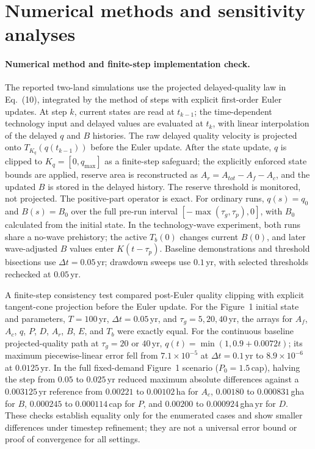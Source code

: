 \documentclass[11pt,a4paper]{article}
\begin{document}
\section{Numerical methods and sensitivity analyses}\label{si:numerics}

\paragraph{Numerical method and finite-step implementation check.} The reported two-land simulations use the projected delayed-quality law in Eq.~(10), integrated by the method of steps with explicit first-order Euler updates. At step $k$, current states are read at $t_{k-1}$; the time-dependent technology input and delayed values are evaluated at $t_k$, with linear interpolation of the delayed $q$ and $B$ histories. The raw delayed quality velocity is projected onto $T_{K_q}(q(t_{k-1}))$ before the Euler update. After the state update, $q$ is clipped to $K_q=[0,q_{\max}]$ as a finite-step safeguard; the explicitly enforced state bounds are applied, reserve area is reconstructed as $A_r=A_{tot}-A_f-A_c$, and the updated $B$ is stored in the delayed history. The reserve threshold is monitored, not projected. The positive-part operator is exact. For ordinary runs, $q(s)=q_0$ and $B(s)=B_0$ over the full pre-run interval $[-\max(\tau_g,\tau_p),0]$, with $B_0$ calculated from the initial state. In the technology-wave experiment, both runs share a no-wave prehistory; the active $T_b(0)$ changes current $B(0)$, and later wave-adjusted $B$ values enter $K(t-\tau_p)$. Baseline demonstrations and threshold bisections use $\Delta t=0.05$\,yr; drawdown sweeps use $0.1$\,yr, with selected thresholds rechecked at $0.05$\,yr.

A finite-step consistency test compared post-Euler quality clipping with explicit tangent-cone projection before the Euler update. For the Figure~1 initial state and parameters, $T=100$\,yr, $\Delta t=0.05$\,yr, and $\tau_g=5,20,40$\,yr, the arrays for $A_f$, $A_c$, $q$, $P$, $D$, $A_r$, $B$, $E$, and $T_b$ were exactly equal. For the continuous baseline projected-quality path at $\tau_g=20$ or $40$\,yr, $q(t)=\min(1,0.9+0.0072t)$; its maximum piecewise-linear error fell from $7.1\times10^{-5}$ at $\Delta t=0.1$\,yr to $8.9\times10^{-6}$ at $0.0125$\,yr. In the full fixed-demand Figure~1 scenario ($P_0=1.5$\,cap), halving the step from $0.05$ to $0.025$\,yr reduced maximum absolute differences against a $0.003125$\,yr reference from $0.00221$ to $0.00102$\,ha for $A_c$, $0.00180$ to $0.000831$\,gha for $B$, $0.000245$ to $0.000114$\,cap for $P$, and $0.00200$ to $0.000924$\,gha\,yr for $D$. These checks establish equality only for the enumerated cases and show smaller differences under timestep refinement; they are not a universal error bound or proof of convergence for all settings.
\end{document}
